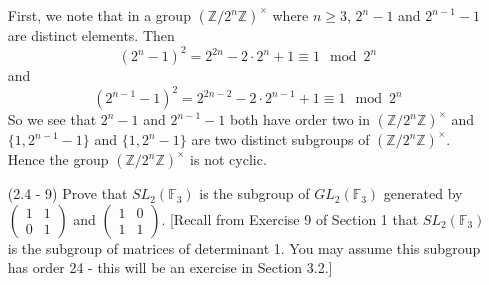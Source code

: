 \documentclass[12pt]{article}
\begin{document}
\begin{enumerate}
\begin{mybox}
    \vspace*{2mm}
    First, we note that in a group
    $(\mathbb{Z}/2^n\mathbb{Z})^{\times}$ where $n\geq 3$,
    $2^n-1$ and $2^{n-1}-1$ are distinct elements. Then
    $$\left(2^n-1\right)^2=2^{2n}-2\cdot2^n+1
    \equiv 1 \mod{2^n}$$
    and
    $$\left(2^{n-1}-1\right)^2=2^{2n-2}-2\cdot2^{n-1}+1
    \equiv 1 \mod{2^n}$$
    So we see that $2^n-1$ and $2^{n-1}-1$ both have
    order two in $(\mathbb{Z}/2^n\mathbb{Z})^{\times}$
    and $\{1,2^{n-1}-1\}$ and $\{1,2^n-1\}$
    are two distinct subgroups of
    $(\mathbb{Z}/2^n\mathbb{Z})^{\times}$. Hence the
    group $(\mathbb{Z}/2^n\mathbb{Z})^{\times}$ is
    not cyclic.
\end{mybox}


\item[(2.4 - 9)] Prove that $SL_2(\mathbb{F}_3)$ is the
subgroup of
$GL_2(\mathbb{F}_3)$ generated by $\left(\begin{array}{cc}
    1 & 1\\
    0 & 1
\end{array}\right)$ and $\left(\begin{array}{cc}
    1 & 0\\
    1 & 1
\end{array}\right)$. [Recall from Exercise 9 of Section 1
that $SL_2(\mathbb{F}_3)$ is the subgroup of matrices of
determinant 1. You may assume this subgroup has order 24
- this will be an exercise in Section 3.2.]

\begin{mybox}


\end{mybox}
\end{enumerate}
\end{document}
